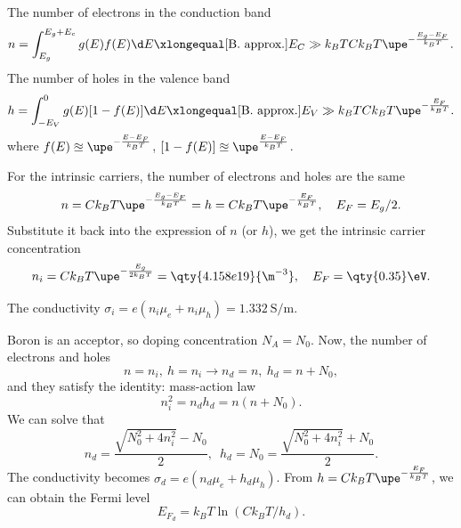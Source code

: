 \begin{solution}\leavevmode
  \begin{enumext}
    \item The number of electrons in the conduction band
    \[
      n = \int_{E_g}^{E_g+E_c} g(E) f(E) \d E
        \xlongequal[\text{B. approx.}]{E_C\gg k_BT}
        Ck_BT\upe^{-\frac{E_g-E_F}{k_BT}}.
    \]
    The number of holes in the valence band
    \[
      h = \int_{-E_V}^0 g(E) [1 - f(E)] \d E
      \xlongequal[\text{B. approx.}]{E_V\gg k_BT}
      Ck_BT\upe^{-\frac{E_F}{k_BT}}.
    \]
    where $f(E) \approxeq \upe^{-\frac{E-E_F}{k_BT}}$,
          $[1 - f(E)] \approxeq \upe^{\frac{E-E_F}{k_BT}}$.
    \item For the intrinsic carriers, the number of electrons and holes are the
    same
    \[
      n = Ck_BT\upe^{-\frac{E_g-E_F}{k_BT}} =
      h = Ck_BT\upe^{-\frac{E_F}{k_BT}}, \quad
      E_F = E_g/2.
    \]
    Substitute it back into the expression of $n$ (or $h$),
    we get the intrinsic carrier concentration
    \[
      n_i = Ck_BT\upe^{-\frac{E_g}{2k_BT}} = \qty{4.158e19}{\m^{-3}},\quad
      E_F = \qty{0.35}\eV.
    \]
    \item The conductivity
    $\sigma_i = e(n_i\mu_e + n_i\mu_h) = \qty{1.332}{\siemens/\m}$.
    \item Boron is an acceptor, so doping concentration $N_A = N_0$.
    Now, the number of electrons and holes
    \[
      n = n_i,\ h = n_i \longrightarrow
      n_d = n,\ h_d = n + N_0,
    \]
    and they satisfy the identity: mass-action law
    \[
      n_i^2 = n_dh_d = n(n + N_0).
    \]
    We can solve that
    \[
      n_d = \frac{\sqrt{N_0^2 + 4n_i^2} - N_0}2,\enspace
      h_d = N_0 = \frac{\sqrt{N_0^2 + 4n_i^2} + N_0}2.
    \]
    The conductivity becomes $\sigma_d = e(n_d\mu_e + h_d\mu_h)$.
    From $h = Ck_BT\upe^{-\frac{E_F}{k_BT}}$, we can obtain the Fermi level
    \[
      E_{F_d} = k_BT \ln(C k_BT/h_d).
    \]
  \end{enumext}
\end{solution}